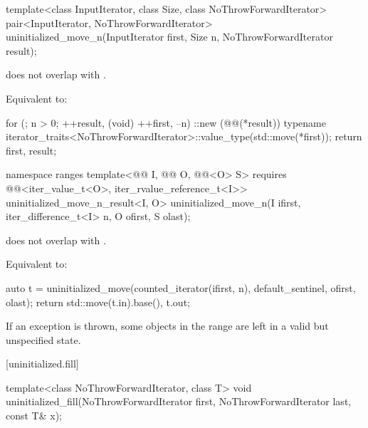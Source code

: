 %
\begin{itemdecl}
template<class InputIterator, class Size, class NoThrowForwardIterator>
  pair<InputIterator, NoThrowForwardIterator>
    uninitialized_move_n(InputIterator first, Size n, NoThrowForwardIterator result);
\end{itemdecl}

\begin{itemdescr}
\pnum
\expects
{} does not overlap with .

\pnum
\effects
Equivalent to:
\begin{codeblock}
for (; n > 0; ++result, (void) ++first, --n)
  ::new (@@(*result))
    typename iterator_traits<NoThrowForwardIterator>::value_type(std::move(*first));
return {first, result};
\end{codeblock}
\end{itemdescr}

%
\begin{itemdecl}
namespace ranges {
  template<@@ I, @@ O, @@<O> S>
    requires @@<iter_value_t<O>, iter_rvalue_reference_t<I>>
    uninitialized_move_n_result<I, O>
      uninitialized_move_n(I ifirst, iter_difference_t<I> n, O ofirst, S olast);
}
\end{itemdecl}

\begin{itemdescr}
\pnum
\expects
{} does not overlap with .

\pnum
\effects
Equivalent to:
\begin{codeblock}
auto t = uninitialized_move(counted_iterator(ifirst, n),
                            default_sentinel, ofirst, olast);
return {std::move(t.in).base(), t.out};
\end{codeblock}

\pnum
\begin{note}
If an exception is thrown, some objects in the range
are left in a valid but unspecified state.
\end{note}
\end{itemdescr}

[uninitialized.fill]{}

%
\begin{itemdecl}
template<class NoThrowForwardIterator, class T>
  void uninitialized_fill(NoThrowForwardIterator first, NoThrowForwardIterator last, const T& x);
\end{itemdecl}


